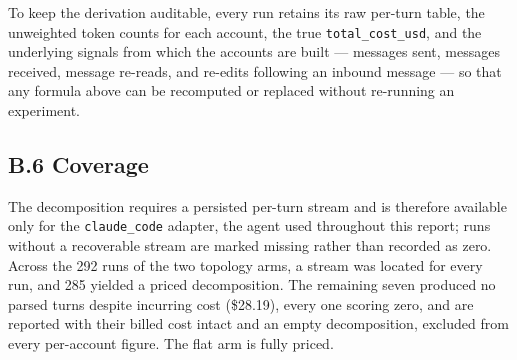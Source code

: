 \documentclass[11pt,a4paper]{article}
\begin{document}
To keep the derivation auditable, every run retains its raw per-turn table, the
unweighted token counts for each account, the true \texttt{total\_cost\_usd}, and
the underlying signals from which the accounts are built --- messages sent,
messages received, message re-reads, and re-edits following an inbound message ---
so that any formula above can be recomputed or replaced without re-running an
experiment.

\subsection*{B.6 \quad Coverage}

\begin{sloppypar}
The decomposition requires a persisted per-turn stream and is therefore available
only for the \texttt{claude\_code} adapter, the agent used throughout this report;
runs without a recoverable stream are marked missing rather than recorded as zero.
Across the 292 runs of the two topology arms, a stream was located for every
run, and 285 yielded a priced decomposition. The remaining seven produced no
parsed turns despite incurring cost (\$28.19), every one scoring zero,
and are reported with their billed cost intact and an empty decomposition,
excluded from every per-account figure. The flat arm is fully priced.
\end{sloppypar}

\end{document}
